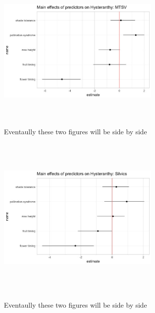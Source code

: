 \documentclass{article}\usepackage[]{graphicx}\usepackage[]{color}
\begin{document}
\begin{figure}[h!]
\includegraphics[width=8cm, height=8cm]{../figure/booteffect_MTSV.jpeg}\\
\caption{Eventaully these two figures will be side by side}
\includegraphics[width=8cm, height=8cm]{../figure/booteffect_sil.jpeg}\\
\caption{Eventaully these two figures will be side by side}
\end{figure}
\end{document}
